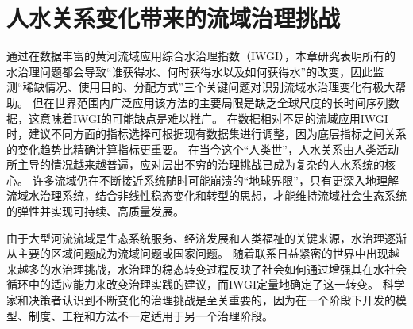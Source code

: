 \section{人\textendash{}水关系变化带来的流域治理挑战}

通过在数据丰富的黄河流域应用综合水治理指数（IWGI），本章研究表明所有的水治理问题都会导致“谁获得水、何时获得水以及如何获得水”的改变，因此监测“稀缺情况、使用目的、分配方式”三个关键问题对识别流域水治理变化有极大帮助。
但在世界范围内广泛应用该方法的主要局限是缺乏全球尺度的长时间序列数据，这意味着IWGI的可能缺点是难以推广。
在数据相对不足的流域应用IWGI时，建议不同方面的指标选择可根据现有数据集进行调整，因为底层指标之间关系的变化趋势比精确计算指标更重要。
在当今这个“人类世”，人\textendash{}水关系由人类活动所主导的情况越来越普遍，应对层出不穷的治理挑战已成为复杂的人水系统的核心\cite{cumming2018,cumming2014,jaeger2019}。
许多流域仍在不断接近系统随时可能崩溃的“地球界限”\cite{gleeson2020, wang-erlandsson2022}，只有更深入地理解流域水治理系统，结合非线性稳态变化和转型的思想，才能维持流域社会\textendash{}生态系统的弹性并实现可持续、高质量发展\cite{falkenmark2019}。

由于大型河流流域是生态系统服务、经济发展和人类福祉的关键来源，水治理逐渐从主要的区域问题成为流域问题或国家问题\cite{best2019,best2020}。
随着联系日益紧密的世界中出现越来越多的水治理挑战，水治理的稳态转变过程反映了社会如何通过增强其在水社会循环中的适应能力来改变治理实践的建议，而IWGI定量地确定了这一转变\cite{loch2020,turton1999,diaz2019}。
科学家和决策者认识到不断变化的治理挑战是至关重要的，因为在一个阶段下开发的模型、制度、工程和方法不一定适用于另一个治理阶段\cite{reyers2018}。
